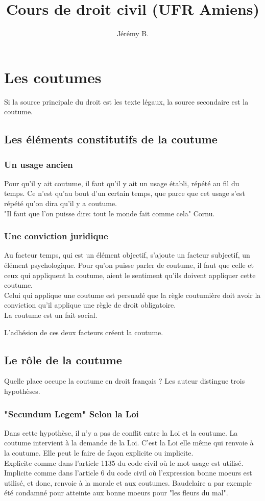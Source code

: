 \documentclass[12pt, a4paper, openany]{book}
\author{Jérémy B.}
\date{}
\title{Cours de droit civil (UFR Amiens)}
\begin{document}
\chapter{Les coutumes}


Si la source principale du droit est les texte légaux, la source secondaire est la coutume.

\section{Les éléments constitutifs de la coutume}
\subsection{Un usage ancien}
Pour qu'il y ait coutume, il faut qu'il y ait un usage établi, répété au fil du temps. Ce n'est qu'au bout d'un certain temps, que parce que cet usage s'est répété qu'on dira qu'il y a coutume. \\
"Il faut que l'on puisse dire: tout le monde fait comme cela" Cornu.


\subsection{Une conviction juridique}
Au facteur temps, qui est un élément objectif, s'ajoute un facteur subjectif, un élément psychologique. Pour qu'on puisse parler de coutume, il faut que celle et ceux qui appliquent la coutume, aient le sentiment qu'ils doivent appliquer cette coutume. \\
Celui qui applique une coutume est persuadé que la règle coutumière doit avoir la conviction qu'il applique une règle de droit obligatoire. \\
La coutume est un fait social.


L'adhésion de ces deux facteurs créent la coutume.


\section{Le rôle de la coutume}
Quelle place occupe la coutume en droit français ? Les auteur distingue trois hypothèses.

\subsection{"Secundum Legem" Selon la Loi}

Dans cette hypothèse, il n'y a pas de conflit entre la Loi et la coutume. La coutume intervient à la demande de la Loi. C'est la Loi elle même qui renvoie à la coutume. Elle peut le faire de façon explicite ou implicite. \\
Explicite comme dans l'article 1135 du code civil où le mot usage est utilisé. \\
Implicite comme dans l'article 6 du code civil où l'expression bonne moeurs est utilisé, et donc, renvoie à la morale et aux coutumes. Baudelaire a par exemple été condamné pour atteinte aux bonne moeurs pour "les fleurs du mal".
\end{document}
